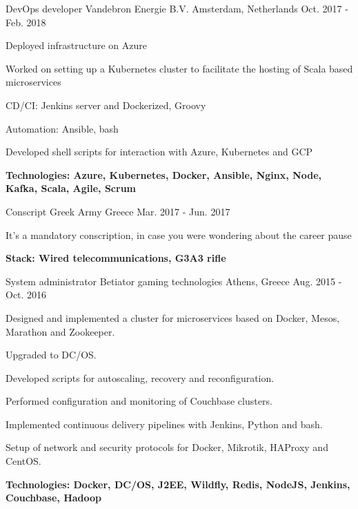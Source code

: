 \begin{cventries}

\cventry
{DevOps developer} %
{Vandebron Energie B.V.} %
{Amsterdam, Netherlands} %
{Oct. 2017 - Feb. 2018} %
{ %
\begin{cvitems}
\item {Deployed infrastructure on Azure}
\item {Worked on setting up a Kubernetes cluster to facilitate the hosting of Scala based microservices}
\item {CD/CI: Jenkins server and Dockerized, Groovy}
\item {Automation: Ansible, bash}
\item {Developed shell scripts for interaction with Azure, Kubernetes and GCP}
\item {\bfseries{Technologies:} Azure, Kubernetes, Docker, Ansible, Nginx, Node, Kafka, Scala, Agile, Scrum}
\end{cvitems}
}


\cventry
{Conscript} %
{Greek Army} %
{Greece} %
{Mar. 2017 - Jun. 2017} %
{ %
\begin{cvitems}
\item {It's a mandatory conscription, in case you were wondering about the career pause}
\item {\bfseries{Stack:} Wired telecommunications, G3A3 rifle}
\end{cvitems}
}


\cventry
{System administrator} %
{Betiator gaming technologies} %
{Athens, Greece} %
{Aug. 2015 - Oct. 2016} %
{ %
\begin{cvitems}
\item {Designed and implemented a cluster for microservices based on Docker, Mesos, Marathon and Zookeeper.}
\item {Upgraded to DC/OS.}
\item {Developed scripts for autoscaling, recovery and reconfiguration.}
\item {Performed configuration and monitoring of Couchbase clusters.}
\item {Implemented continuous delivery pipelines with Jenkins, Python and bash.}
\item {Setup of network and security protocols for Docker, Mikrotik, HAProxy and CentOS.}
\item {\bfseries{Technologies:} Docker, DC/OS, J2EE, Wildfly, Redis, NodeJS, Jenkins, Couchbase, Hadoop}
\end{cvitems}
}


\end{cventries}
